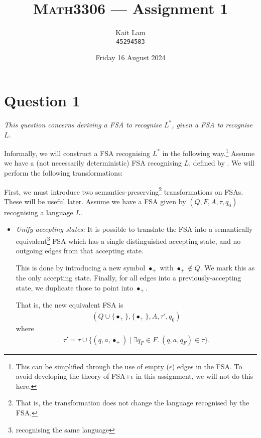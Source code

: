 \documentclass[a4paper]{article}
\author{Kait Lam \\ \small \texttt{45294583}}
\title{\textsc{Math3306} --- Assignment 1}
\date{Friday 16 August 2024}
\begin{document}
\maketitle


\section*{Question 1}
\begin{center}
  \textit{This question concerns deriving a FSA to recognise $L^*$, given a FSA to recognise $L$.}
\end{center}
Informally, we will construct a FSA recognising $L^*$ in the following way.\footnote{
  This can be simplified through the use of empty ($\epsilon$) edges in the FSA.
To avoid developing the theory of FSA+$\epsilon$ in this assignment, we will not
do this here.
}
Assume we have a (not necessarily deterministic) FSA recognising $L$, defined by .
We will perform the following transformations:

\noindent First, we must introduce two semantics-preserving\footnote{
  That is, the transformation does not change the language recognised by the FSA.
} transformations on FSAs.
These will be useful later.
Assume we have a FSA given by $(Q, F, A, \tau, q_0)$ recognising a language $L$.
\begin{itemize}
  \item \textit{Unify accepting states:} It is possible to translate the FSA
    into a semantically equivalent\footnote{recognising the same language} FSA
    which has a single distinguished accepting state, and no outgoing edges from that accepting state.

    This is done by introducing a new symbol $\bullet_+$ with
    $\bullet_+ \notin Q$. We mark this as the only accepting state.
    Finally, for all edges into a previously-accepting state, we
    duplicate those to point into $\bullet_+$.

    That is, the new equivalent FSA is
    \begin{align*}
      (Q \cup \{\bullet_+\}, \{\bullet_+\}, A, \tau', q_0)
    \end{align*}
    where
    \begin{align*}
      \tau' = \tau \cup \big\{(q, a, \bullet_+)
      \mid \exists q_F \in F.~ (q,a,q_F) \in \tau\big\}.
    \end{align*}




\end{itemize}
\end{document}
